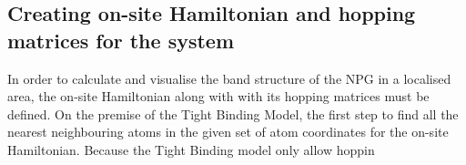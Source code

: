 \subsection{Creating on-site Hamiltonian and hopping matrices for the system}
In order to calculate and visualise the band structure of the NPG in a localised area, the on-site Hamiltonian along with with its hopping matrices must be defined. On the premise of the Tight Binding Model, the first step to find all the nearest neighbouring atoms in the given set of atom coordinates for the on-site Hamiltonian. Because the Tight Binding model only allow hoppin 
